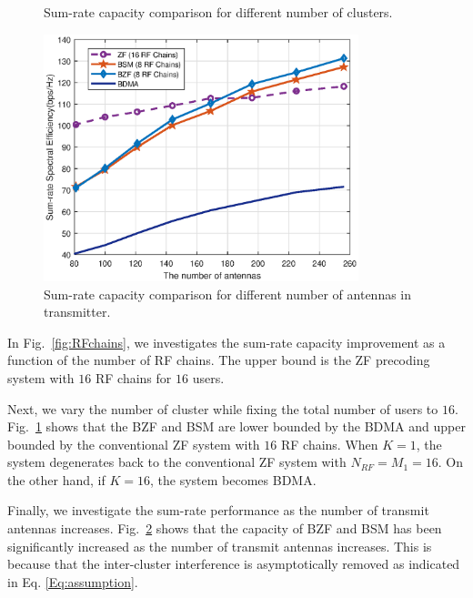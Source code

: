 \documentclass[conference]{IEEEtran}
\begin{document}
{\begin{figure}[ht]
\begin{center}
		\caption{Sum-rate capacity comparison for different number of clusters.}\label{fig:differentK}
	\end{center}
\end{figure}
\begin{figure}[ht] 
	\begin{center}
		\includegraphics[width=3.6in]{Figure/antenna1path.eps}
		\caption{Sum-rate capacity comparison for different number of antennas in transmitter.}\label{fig:CDF}
	\end{center}
\end{figure}

In Fig.~\ref{fig:RFchains}, we investigates the sum-rate capacity improvement as a function of the number of RF chains. The upper bound is the ZF precoding system with $16$ RF chains for $16$ users. 

Next, we vary the number of cluster while fixing the total number of users to $16$. Fig.~\ref{fig:differentK} shows that the BZF and BSM are lower bounded by the BDMA and upper bounded by the conventional ZF system with $16$ RF chains. When $K=1$, the system degenerates back to the conventional ZF system with $N_{RF}=M_1=16$. On the other hand, if $K=16$, the system becomes BDMA.

Finally, we investigate the sum-rate performance as the number of transmit antennas increases. Fig.~\ref{fig:CDF} shows that the capacity of BZF and BSM has been significantly increased as the number of transmit antennas increases. This is because that the inter-cluster interference is asymptotically removed as indicated in Eq. \eqref{Eq:assumption}.

}
\end{document}
